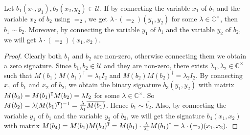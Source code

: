 \begin{lemma}\label{lem-binary-sim}
    Let ${b_1}(x_1, y_1), {b_2}(x_2, y_2)\in {\mathcal{U}}$. 
    If by connecting the variable $x_1$ of ${b_1}$ and the variable $x_2$ of ${b_2}$ using $=_2$, we get $\lambda\cdot (=_2)(y_1, y_2)$ for some $\lambda\in \mathbb{C}^\times$, then ${b_1}\sim \overline{b_2}$. 
    Moreover, by connecting the variable $y_1$ of ${b_1}$ and the variable $y_2$ of ${b_2}$, we will get $\lambda\cdot (=_2)(x_1, x_2)$.
\end{lemma}

\begin{proof}
Clearly both $b_1$ and $b_2$ are non-zero, otherwise connecting them we obtain a zero signature.
Since $b_1, b_2\in \mathcal{U}$ and they are non-zero, there exists $\lambda_1,\lambda_2\in \mathbb C^\times$ such that $M(b_1)M(b_1)^\dagger=\lambda_1I_2$ and  $M(b_2)M(b_2)^\dagger=\lambda_2I_2$.
By connecting $x_1$ of $b_1$ and $x_2$ of $b_2$, we obtain the binary signature $b_3(y_1,y_2)$ with matrix $M(b_3)=M(b_1)^{\tt T}M(b_2)=\lambda I_2$ for some $\lambda\in \mathbb{C}^\times.$
So $M(b_2)=\lambda (M(b_1)^{\tt T})^{-1}=\frac{\lambda}{\lambda_1} \overline{M(b_1)}$.
Hence $b_1\sim \overline{b_2}$.
Also, by connecting the variable $y_1$ of ${b_1}$ and the variable $y_2$ of ${b_2}$, we will get the signature $b_4(x_1,x_2)$ with matrix $M(b_4)=M(b_1)M(b_2)^{\tt T}=M(b_1)\cdot \frac{\lambda}{\lambda_1}M(b_1)^\dagger=\lambda\cdot(=_2)(x_1, x_2).$
\end{proof}

